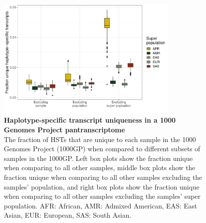 \documentclass[11pt]{ucthesis}
\begin{document}
\begin{figure}[H]
\ssp
\begin{center}
\includegraphics[width=0.8\textwidth]{mpmapfigures/figureS5.pdf}
\caption{\textbf{Haplotype-specific transcript uniqueness in a 1000 Genomes Project pantranscriptome} \\
The fraction of HSTs that are unique to each sample in the 1000 Genomes Project (1000GP) when compared to different subsets of samples in the 1000GP. Left box plots show the fraction unique when comparing to all other samples, middle box plots show the fraction unique when comparing to all other samples excluding the samples’ population, and right box plots show the fraction unique when comparing to all other samples excluding the samples’ super population. AFR: African, AMR: Admixed American, EAS: East Asian, EUR: European, SAS: South Asian.
} \label{fig:hst-populations}
\end{center}
\end{figure}
\end{document}
